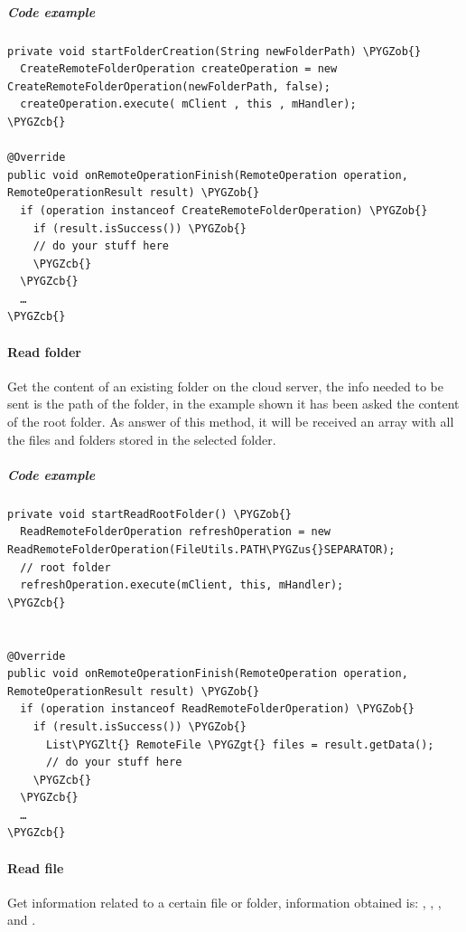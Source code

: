 \documentclass[letterpaper,10pt,english]{sphinxmanual}
\def\PYGZus{\char`\_}
\def\PYGZob{\char`\{}
\def\PYGZcb{\char`\}}
\def\PYGZlt{\char`\<}
\def\PYGZgt{\char`\>}
\begin{document}
\subparagraph{Code example}
\label{android_library/examples:id2}
\begin{Verbatim}[commandchars=\\\{\}]
private void startFolderCreation(String newFolderPath) \PYGZob{}
  CreateRemoteFolderOperation createOperation = new CreateRemoteFolderOperation(newFolderPath, false);
  createOperation.execute( mClient , this , mHandler);
\PYGZcb{}

@Override
public void onRemoteOperationFinish(RemoteOperation operation, RemoteOperationResult result) \PYGZob{}
  if (operation instanceof CreateRemoteFolderOperation) \PYGZob{}
    if (result.isSuccess()) \PYGZob{}
    // do your stuff here
    \PYGZcb{}
  \PYGZcb{}
  …
\PYGZcb{}
\end{Verbatim}


\paragraph{Read folder}
\label{android_library/examples:read-folder}
Get the content of an existing folder on the cloud server, the info needed to
be sent is the path of the folder, in the example shown it has been asked the
content of the root folder.  As answer of this method, it will be received an
array with all the files and folders stored in the selected folder.


\subparagraph{Code example}
\label{android_library/examples:id3}
\begin{Verbatim}[commandchars=\\\{\}]
private void startReadRootFolder() \PYGZob{}
  ReadRemoteFolderOperation refreshOperation = new ReadRemoteFolderOperation(FileUtils.PATH\PYGZus{}SEPARATOR);
  // root folder
  refreshOperation.execute(mClient, this, mHandler);
\PYGZcb{}


@Override
public void onRemoteOperationFinish(RemoteOperation operation, RemoteOperationResult result) \PYGZob{}
  if (operation instanceof ReadRemoteFolderOperation) \PYGZob{}
    if (result.isSuccess()) \PYGZob{}
      List\PYGZlt{} RemoteFile \PYGZgt{} files = result.getData();
      // do your stuff here
    \PYGZcb{}
  \PYGZcb{}
  …
\PYGZcb{}
\end{Verbatim}


\paragraph{Read file}
\label{android_library/examples:read-file}
Get information related to a certain file or folder, information obtained is:
, , ,  and .
\end{document}
